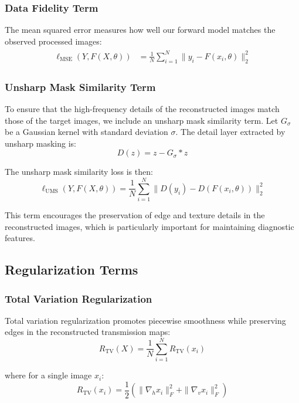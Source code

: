 \documentclass[nomenclature, english, bibtex]{kththesis}
\numberwithin{listing}{chapter}
\begin{document}
\subsubsection{Data Fidelity Term}
The mean squared error measures how well our forward model matches the observed processed images:
\begin{align}
    \begin{split}
\ell_{\text{MSE}}(Y, F(X, \theta)) &= \frac{1}{N} \sum_{i=1}^N \|y_i - F(x_i, \theta)\|_2^2
    \end{split}
\end{align}

\subsubsection{Unsharp Mask Similarity Term}
To ensure that the high-frequency details of the reconstructed images match those of the target images, we include an unsharp mask similarity term. Let $G_\sigma$ be a Gaussian kernel with standard deviation $\sigma$. The detail layer extracted by unsharp masking is:
\begin{equation}
D(z) = z - G_\sigma * z
\end{equation}

The unsharp mask similarity loss is then:
\begin{equation}
\ell_{\text{UMS}}(Y, F(X, \theta)) = \frac{1}{N} \sum_{i=1}^N \|D(y_i) - D(F(x_i, \theta))\|_2^2
\end{equation}

This term encourages the preservation of edge and texture details in the reconstructed images, which is particularly important for maintaining diagnostic features.

\subsection{Regularization Terms}

\subsubsection{Total Variation Regularization}
Total variation regularization promotes piecewise smoothness while preserving edges in the reconstructed transmission maps:
\begin{equation}
R_{\text{TV}}(X) = \frac{1}{N} \sum_{i=1}^N R_{\text{TV}}(x_i)
\end{equation}

where for a single image $x_i$:
\begin{equation}
R_{\text{TV}}(x_i) = \frac{1}{2} \left( \|\nabla_h x_i\|_F^2 + \|\nabla_v x_i\|_F^2 \right)
\end{equation}
\end{document}
